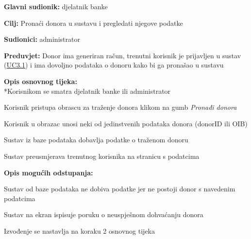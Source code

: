 					
					\noindent {}
					\begin{packed_item}  \label{UC4.1}
	
						\item \textbf{Glavni sudionik: }djelatnik banke
						\item  \textbf{Cilj:} Pronaći donora u sustavu i pregledati njegove podatke
						\item  \textbf{Sudionici:} administrator
						\item  \textbf{Preduvjet:} Donor ima generiran račun, trenutni korisnik je prijavljen u sustav (\hyperref[UC3.1]{UC3.1}) i ima dovoljno podataka o donoru kako bi ga pronašao u sustavu
						\item  \textbf{Opis osnovnog tijeka:}
						\\ *Korisnikom se smatra djelatnik banke ili administrator
						\item[] \begin{packed_enum}
	                    
	                        \item Korisnik pristupa obrascu za traženje donora klikom na gumb \textit{Pronađi donora}
	                        \item Korisnik u obrazac unosi neki od jedinstvenih podataka donora (donorID ili OIB)
	                        \item Sustav iz baze podataka dobavlja podatke o traženom donoru
	                        \item Sustav preusmjerava trenutnog korisnika na stranicu s podatcima 

						\end{packed_enum}
						
						\item  \textbf{Opis mogućih odstupanja:}
						\item[] \begin{packed_item}
	
							\item[3] Sustav od baze podataka ne dobiva podatke jer ne postoji donor s navedenim podatcima
							\item[] \begin{packed_enum}
								\item Sustav na ekran ispisuje poruku o neuspješnom dohvaćanju donora
								\item Izvođenje se nastavlja na koraku 2 osnovnog tijeka
							\end{packed_enum}
							
						\end{packed_item}
						
					\end{packed_item}
					

